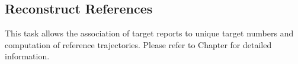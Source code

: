 
\subsection{Reconstruct References}
\label{sec:ui_proc_reconst_references}

This task allows the association of target reports to unique target numbers and computation of reference trajectories. 
Please refer to Chapter  for detailed information.
